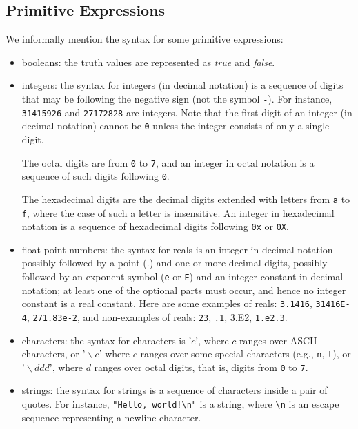 \subsection{Primitive Expressions}
We informally mention the syntax for some primitive expressions:
\begin{itemize}
\item booleans: the truth values are represented as
{\it true} and {\it false}.

\item integers: the syntax for integers (in decimal notation)
is a sequence of digits that may be following the negative sign
\texttt{}
(not the symbol \texttt{-}). For instance, \texttt{31415926} and
\texttt{{}27172828} are integers. Note that the first digit
of an integer (in decimal notation) cannot be \texttt{0} unless the
integer consists of only a single digit.

The octal digits are from \texttt{0} to \texttt{7}, and an
integer in octal notation is a sequence of such digits following
\texttt{0}.

The hexadecimal digits are
the decimal digits extended with letters from
\texttt{a} to \texttt{f}, where the case of such a letter
is insensitive. An integer in hexadecimal notation is a sequence of
hexadecimal digits following \texttt{0x} or \texttt{0X}.

\item float point numbers:
the syntax for reals is an integer in decimal notation possibly followed by
a point (.) and one or more decimal digits, possibly followed by an
exponent symbol (\texttt{e} or \texttt{E}) and an integer constant in
decimal notation; at least one of the optional parts must occur, and hence
no integer constant is a real constant.  Here are some examples of reals:
\texttt{3.1416}, \texttt{31416E-4}, \texttt{271.83e-2}, and non-examples of
reals: \texttt{23}, \texttt{.1}, {3.E2}, \texttt{1.e2.3}.

\item
characters: the syntax for characters is $\texttt{'}c\texttt{'}$, where $c$
ranges over ASCII characters, or $\texttt{'}\backslash c\texttt{'}$ where
$c$ ranges over some special characters (e.g., \texttt{n}, \texttt{t}), or
$\texttt{'}\backslash ddd\texttt{'}$, where $d$ ranges over octal digits,
that is, digits from \texttt{0} to \texttt{7}.

\item
strings: the syntax for strings is a sequence of characters inside a pair
of quotes. For instance, \verb`"Hello, world!\n"` is a string, where
\verb`\n` is an escape sequence representing a newline character.
\end{itemize}

